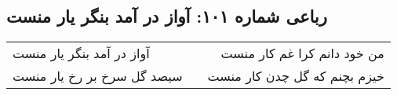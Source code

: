 \begin{center}
\section*{رباعی شماره ۱۰۱: آواز در آمد بنگر یار منست}
\label{sec:sh101}
\begin{longtable}{l p{0.5cm} r}
آواز در آمد بنگر یار منست
&&
من خود دانم کرا غم کار منست
\\
سیصد گل سرخ بر رخ یار منست
&&
خیزم بچنم که گل چدن کار منست
\\
\end{longtable}
\end{center}
